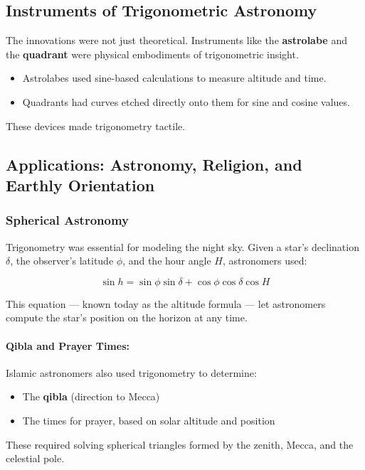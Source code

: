 \subsection{Instruments of Trigonometric Astronomy}

The innovations were not just theoretical. Instruments like the \textbf{astrolabe} and the \textbf{quadrant} were physical embodiments of trigonometric insight.

\begin{itemize}
    \item Astrolabes used sine-based calculations to measure altitude and time.
    \item Quadrants had curves etched directly onto them for sine and cosine values.
\end{itemize}

These devices made trigonometry tactile.

\subsection{Applications: Astronomy, Religion, and Earthly Orientation}

\subsubsection{Spherical Astronomy} 

Trigonometry was essential for modeling the night sky. Given a star’s declination \( \delta \), the observer’s latitude \( \phi \), and the hour angle \( H \), astronomers used:

\[
\sin h = \sin \phi \sin \delta + \cos \phi \cos \delta \cos H
\]

This equation — known today as the altitude formula — let astronomers compute the star’s position on the horizon at any time.

\paragraph{Qibla and Prayer Times:} Islamic astronomers also used trigonometry to determine:

\begin{itemize}
    \item The \textbf{qibla} (direction to Mecca)
    \item The times for prayer, based on solar altitude and position
\end{itemize}

These required solving spherical triangles formed by the zenith, Mecca, and the celestial pole.

